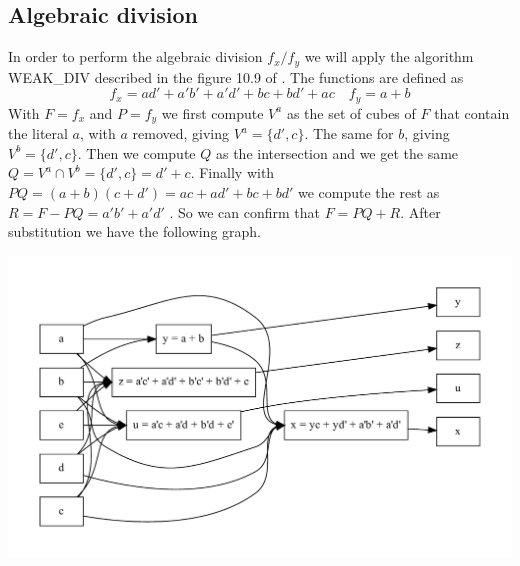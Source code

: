 \documentclass[a4paper]{article}
\begin{document}
\subsection{Algebraic division}
%
In order to perform the algebraic division $f_x / f_y$ we will apply the 
algorithm WEAK\_DIV described in the figure 10.9 of \cite{hachtel}. The 
functions are defined as
%
$$ f_x = ad' + a'b' + a'd' + bc + bd' + ac \quad f_y = a + b $$
%
With $F=f_x$ and $P=f_y$ we first compute $V^a$ as the set of cubes of $F$ that 
contain the literal $a$, with $a$ removed, giving $V^a = \{d', c\}$. The same 
for $b$, giving $V^b = \{d', c\}$. Then we compute $Q$ as the intersection and 
we get the same $Q = V^a \cap V^b = \{d', c\} = d' + c$. Finally with $PQ = (a + 
b)(c + d') = ac + ad' + bc + bd'$ we compute the rest as $R = F - PQ = a'b' + a' 
d'$ . So we can confirm that $F = PQ + R$. After substitution we have the 
following graph.
\begin{center}
\includegraphics[scale=.5]{5b-graph.pdf}
\end{center}
%
\end{document}
